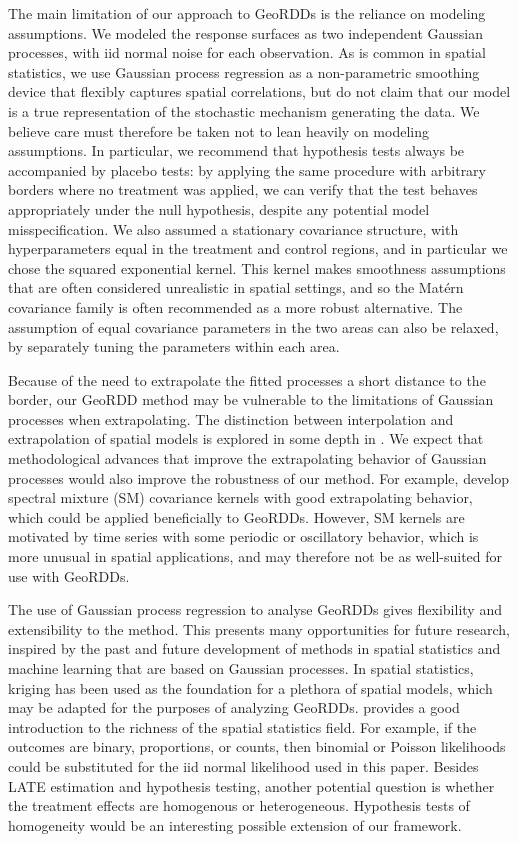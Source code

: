 \documentclass[12pt]{article}
\begin{document}
The main limitation of our approach to GeoRDDs is the reliance on modeling assumptions.
We modeled the response surfaces as two independent Gaussian processes, with iid normal noise for each observation.
As is common in spatial statistics, we use Gaussian process regression as a non-parametric smoothing device that flexibly captures spatial correlations, but do not claim that our model is a true representation of the stochastic mechanism generating the data.
We believe care must therefore be taken not to lean heavily on modeling assumptions.
In particular, we recommend that hypothesis tests always be accompanied by placebo tests:
by applying the same procedure with arbitrary borders where no treatment was applied, we can verify that the test behaves appropriately under the null hypothesis, despite any potential model misspecification.
We also assumed a stationary covariance structure, with hyperparameters equal in the treatment and control regions, and in particular we chose the squared exponential kernel.
This kernel makes smoothness assumptions that are often considered unrealistic in spatial settings, and so the Matérn covariance family is often recommended as a more robust alternative.
The assumption of equal covariance parameters in the two areas can also be relaxed, by separately tuning the parameters within each area.

Because of the need to extrapolate the fitted processes a short distance to the border, our GeoRDD method may be vulnerable to the limitations of Gaussian processes when extrapolating.
The distinction between interpolation and extrapolation of spatial models is explored in some depth in \cite{stein2012interpolation}.
We expect that methodological advances that improve the extrapolating behavior of Gaussian processes would also improve the robustness of our method.
For example, \cite{wilson2013gaussian} develop spectral mixture (SM) covariance kernels with good extrapolating behavior, which could be applied beneficially to GeoRDDs.
However, SM kernels are motivated by time series with some periodic or oscillatory behavior, which is more unusual in spatial applications, and may therefore not be as well-suited for use with GeoRDDs.

The use of Gaussian process regression to analyse GeoRDDs gives flexibility and extensibility to the method.
This presents many opportunities for future research, inspired by the past and future development of methods in spatial statistics and machine learning that are based on Gaussian processes.
In spatial statistics, kriging has been used as the foundation for a plethora of spatial models, which may be adapted for the purposes of analyzing GeoRDDs.
\cite{banerjee2014hierarchical} provides a good introduction to the richness of the spatial statistics field.
For example, if the outcomes are binary, proportions, or counts, then binomial or Poisson likelihoods could be substituted for the iid normal likelihood used in this paper.
Besides LATE estimation and hypothesis testing, another potential question is whether the treatment effects are homogenous or heterogeneous.
Hypothesis tests of homogeneity would be an interesting possible extension of our framework.
\end{document}

